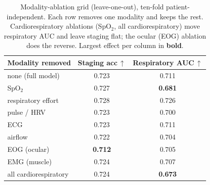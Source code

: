 \documentclass[preprint,12pt]{elsarticle}
\providecommand{\DIFaddbegin}{} %
\providecommand{\DIFaddend}{} %
\providecommand{\DIFdelbegin}{} %
\providecommand{\DIFdelend}{} %
\providecommand{\DIFaddbeginFL}{} %
\providecommand{\DIFaddendFL}{} %
\providecommand{\DIFdelbeginFL}{} %
\providecommand{\DIFdelendFL}{} %
\providecommand{\DIFscaledelfig}{0.5}
\newlength{\DIFdelgraphicswidth} %
\newlength{\DIFdelgraphicsheight} %
\providecommand{\DIFaddincludegraphics}[2][]{{\color{blue}\fbox{\DIFOincludegraphics[#1]{#2}}}} %
\providecommand{\DIFdelincludegraphics}[2][]{%
\sbox{\DIFdelgraphicsbox}{\DIFOincludegraphics[#1]{#2}}%
\settoboxwidth{\DIFdelgraphicswidth}{\DIFdelgraphicsbox} %
\settoboxtotalheight{\DIFdelgraphicsheight}{\DIFdelgraphicsbox} %
\scalebox{\DIFscaledelfig}{%
\parbox[b]{\DIFdelgraphicswidth}{\usebox{\DIFdelgraphicsbox}\\[-\baselineskip] \rule{\DIFdelgraphicswidth}{0em}}\llap{\resizebox{\DIFdelgraphicswidth}{\DIFdelgraphicsheight}{%
\setlength{\unitlength}{\DIFdelgraphicswidth}%
\begin{picture}(1,1)%
\thicklines\linethickness{2pt} %
{\color[rgb]{1,0,0}\put(0,0){\framebox(1,1){}}}%
{\color[rgb]{1,0,0}\put(0,0){\line( 1,1){1}}}%
{\color[rgb]{1,0,0}\put(0,1){\line(1,-1){1}}}%
\end{picture}%
}\hspace*{3pt}}} %
} %
\DeclareRobustCommand{\DIFaddbegin}{\DIFOaddbegin \let\includegraphics\DIFaddincludegraphics} %
\DeclareRobustCommand{\DIFaddend}{\DIFOaddend \let\includegraphics\DIFOincludegraphics} %
\DeclareRobustCommand{\DIFdelbegin}{\DIFOdelbegin \let\includegraphics\DIFdelincludegraphics} %
\DeclareRobustCommand{\DIFdelend}{\DIFOaddend \let\includegraphics\DIFOincludegraphics} %
\DeclareRobustCommand{\DIFaddbeginFL}{\DIFOaddbeginFL \let\includegraphics\DIFaddincludegraphics} %
\DeclareRobustCommand{\DIFaddendFL}{\DIFOaddendFL \let\includegraphics\DIFOincludegraphics} %
\DeclareRobustCommand{\DIFdelbeginFL}{\DIFOdelbeginFL \let\includegraphics\DIFdelincludegraphics} %
\DeclareRobustCommand{\DIFdelendFL}{\DIFOaddendFL \let\includegraphics\DIFOincludegraphics} %
\begin{document}
\DIFdelbegin %
\DIFdelendFL \DIFaddbeginFL \begin{table}[t]
\caption{Modality-ablation grid (leave-one-out), ten-fold patient-independent. Each row removes
one modality and keeps the rest. Cardiorespiratory ablations (SpO$_2$, all cardiorespiratory)
move respiratory AUC and leave staging flat; the ocular (EOG) ablation does the reverse. Largest
effect per column in \textbf{bold}.}
\label{tab:ablate}
\DIFaddendFL \centering
\DIFdelbeginFL %
\DIFdelend \DIFaddbegin \setlength{\tabcolsep}{8pt}
\begin{tabular}{lcc}
\toprule
Modality removed & Staging acc\,$\uparrow$ & Respiratory AUC\,$\uparrow$ \\
\midrule
none (full model)        & 0.723 & 0.711 \\
SpO$_2$                  & 0.727 & \textbf{0.681} \\
respiratory effort       & 0.728 & 0.726 \\
pulse / HRV              & 0.723 & 0.700 \\
ECG                      & 0.723 & 0.711 \\
airflow                  & 0.722 & 0.704 \\
EOG (ocular)             & \textbf{0.712} & 0.705 \\
EMG (muscle)             & 0.724 & 0.707 \\
all cardiorespiratory    & 0.724 & \textbf{0.673} \\
\bottomrule
\end{tabular}
\end{table}

\DIFaddend 
\end{document}
